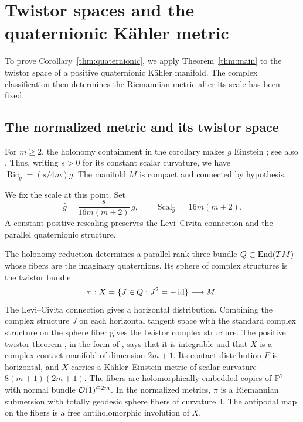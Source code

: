 \section{Twistor spaces and the quaternionic K\"ahler metric}
\label{tw:section}

To prove Corollary~\ref{thm:quaternionic}, we apply
Theorem~\ref{thm:main} to the twistor space of a positive quaternionic
K\"ahler manifold. The complex classification then determines
the Riemannian metric after its scale has been fixed.

\subsection{The normalized metric and its twistor space}

For $m\geq2$, the holonomy containment in the corollary makes $g$
Einstein \cite{Salamon1982}; see also \cite[Definition~1.1 and the
following discussion]{LeBrun1995}. Thus, writing $s>0$ for its constant
scalar curvature, we have $\operatorname{Ric}_g=(s/4m)g$.
The manifold $M$ is compact and connected by hypothesis.

We fix the scale at this point. Set
\begin{equation}\label{tw:normalization}
\widehat g=\frac{s}{16m(m+2)}\,g,
\qquad
\operatorname{Scal}_{\widehat g}=16m(m+2).
\end{equation}
A constant positive rescaling preserves the Levi--Civita connection
and the parallel quaternionic structure.

The holonomy reduction determines a parallel rank-three bundle
$Q\subset\operatorname{End}(TM)$ whose fibers are the imaginary
quaternions. Its sphere of complex structures is the twistor bundle
\[
\pi:X=\{J\in Q:J^2=-\operatorname{id}\}\longrightarrow M.
\]
The Levi--Civita connection gives a horizontal distribution. Combining
the complex structure $J$ on each horizontal tangent space with the
standard complex structure on the sphere fiber gives the twistor
complex structure. The positive twistor theorem
\cite{Salamon1982}, in the form of
\cite[Theorem~2.1]{LeBrun1995}, says that it is integrable and that
$X$ is a complex contact manifold of dimension $2m+1$. Its contact
distribution $F$ is horizontal, and $X$ carries a K\"ahler--Einstein
metric of scalar curvature $8(m+1)(2m+1)$.
The fibers are holomorphically embedded copies of $\mathbb P^1$ with normal
bundle $\mathcal O(1)^{\oplus2m}$. In the normalized metrics, $\pi$ is a
Riemannian submersion with totally geodesic sphere fibers of curvature
$4$. The antipodal map on the fibers is a free antiholomorphic
involution of $X$.

